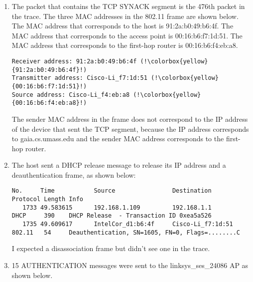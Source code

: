 \documentclass{article}
\begin{document}
\begin{enumerate}
    \item The packet that contains the TCP SYNACK segment is the 476th packet in the trace. The three MAC addresses in the 802.11 frame are shown below. The MAC address that corresponds to the host is 91:2a:b0:49:b6:4f. The MAC address that corresponds to the access point is 00:16:b6:f7:1d:51. The MAC address that corresponds to the first-hop router is 00:16:b6:f4:eb:a8.
\begin{verbatim}
Receiver address: 91:2a:b0:49:b6:4f (!\colorbox{yellow}{91:2a:b0:49:b6:4f}!)
Transmitter address: Cisco-Li_f7:1d:51 (!\colorbox{yellow}{00:16:b6:f7:1d:51}!)
Source address: Cisco-Li_f4:eb:a8 (!\colorbox{yellow}{00:16:b6:f4:eb:a8}!)
\end{verbatim}

    The sender MAC address in the frame does not correspond to the IP address of the device that sent the TCP segment, because the IP address corresponds to gaia.cs.umass.edu and the sender MAC address corresponds to the first-hop router.

    \item The host sent a DHCP release message to release its IP address and a deauthentication frame, as shown below:
\begin{verbatim}
No.     Time           Source                Destination           Protocol Length Info
   1733 49.583615      192.168.1.109         192.168.1.1           DHCP     390    DHCP Release  - Transaction ID 0xea5a526
   1735 49.609617      IntelCor_d1:b6:4f     Cisco-Li_f7:1d:51     802.11   54     Deauthentication, SN=1605, FN=0, Flags=........C
\end{verbatim}
    I expected a disassociation frame but didn't see one in the trace.

    \item 15 AUTHENTICATION messages were sent to the linksys\_ses\_24086 AP as shown below.
    

\end{enumerate}
\end{document}
